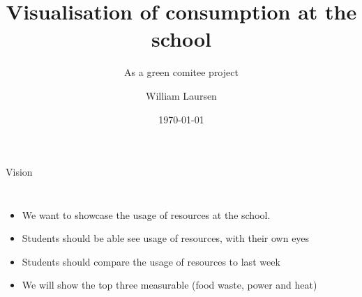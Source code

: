 \documentclass[aspectratio=169,handout]{beamer}
\title{Visualisation of consumption at the school}
\subtitle{As a green comitee project}
\author{William Laursen}
\date{\today}
\begin{document}
\begin{frame}
    \titlepage
\end{frame}
\begin{frame}{Vision}
\begin{columns}
\begin{itemize}
\item We want to showcase the usage of resources at the school.
\item Students should be able see usage of resources, with their own eyes
\item Students should compare the usage of resources to last week
\item We will show the top three measurable (food waste, power and heat)
\end{itemize}
\centering

\end{columns}
\end{frame}
\end{document}
